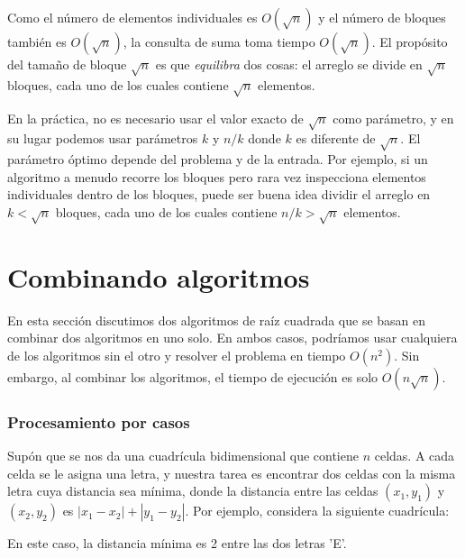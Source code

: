 Como el número de elementos individuales es $O(\sqrt n)$
y el número de bloques también es $O(\sqrt n)$,
la consulta de suma toma tiempo $O(\sqrt n)$.
El propósito del tamaño de bloque $\sqrt n$ es
que \emph{equilibra} dos cosas:
el arreglo se divide en $\sqrt n$ bloques,
cada uno de los cuales contiene $\sqrt n$ elementos.

En la práctica, no es necesario usar el
valor exacto de $\sqrt n$ como parámetro,
y en su lugar podemos usar parámetros $k$ y $n/k$ donde $k$ es
diferente de $\sqrt n$.
El parámetro óptimo depende del problema y de la entrada.
Por ejemplo, si un algoritmo a menudo recorre
los bloques pero rara vez inspecciona
elementos individuales dentro de los bloques,
puede ser buena idea dividir el arreglo en
$k < \sqrt n$ bloques, cada uno de los cuales contiene $n/k > \sqrt n$
elementos.

\section{Combinando algoritmos}

En esta sección discutimos dos algoritmos de raíz cuadrada
que se basan en combinar dos algoritmos en uno solo.
En ambos casos, podríamos usar cualquiera de los algoritmos
sin el otro
y resolver el problema en tiempo $O(n^2)$.
Sin embargo, al combinar los algoritmos, el tiempo de
ejecución es solo $O(n \sqrt n)$.

\subsubsection{Procesamiento por casos}

Supón que se nos da una
cuadrícula bidimensional que contiene $n$ celdas.
A cada celda se le asigna una letra,
y nuestra tarea es encontrar dos celdas
con la misma letra cuya distancia sea mínima,
donde la distancia entre las celdas
$(x_1,y_1)$ y $(x_2,y_2)$ es $|x_1-x_2|+|y_1-y_2|$.
Por ejemplo, considera la siguiente cuadrícula:

\begin{center}
\end{center}
En este caso, la distancia mínima es 2 entre las dos letras 'E'.

